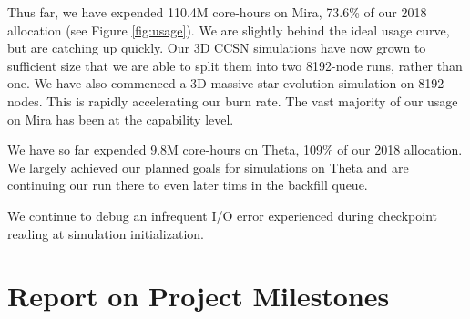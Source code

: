 \documentclass[12pt,titlepage]{article}
\begin{document}
Thus far, we have expended 110.4M core-hours on Mira, 73.6\% of our 2018 allocation (see Figure \ref{fig:usage}).
We are slightly behind the ideal usage curve, but are catching up quickly.
Our 3D CCSN simulations have now grown to sufficient size that we are able to split them into two 8192-node runs, rather than one. 
We have also commenced a 3D massive star evolution simulation on 8192 nodes. 
This is rapidly accelerating our burn rate.
The vast majority of our usage on Mira has been at the capability level.


We have so far expended 9.8M core-hours on Theta, 109\% of our 2018 allocation. 
We largely achieved our planned goals for simulations on Theta and are continuing our run there to even later tims in the backfill queue. 

We continue to debug an infrequent I/O error experienced during checkpoint reading at simulation initialization. 





\section{Report on Project Milestones}
\end{document}
